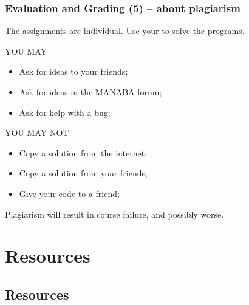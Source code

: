\documentclass{beamer}
\begin{document}
\begin{frame}
  \frametitle{Evaluation and Grading (5) -- about plagiarism}
  
  The assignments are \alert{individual}. Use your  to solve the programs.

  \begin{exampleblock}{YOU MAY}
    \begin{itemize}
    \item Ask for ideas to your friends;
    \item Ask for ideas in the MANABA forum;
    \item Ask for help with a bug;
    \end{itemize}
  \end{exampleblock}

  \begin{alertblock}{YOU MAY NOT}
    \begin{itemize}
    \item Copy a solution from the internet;
    \item Copy a solution from your friends;
    \item Give your code to a friend;
    \end{itemize}
  \end{alertblock}

  Plagiarism will result in course failure, and possibly worse.
\end{frame}

\section{Resources}
\subsection{Resources}
\end{document}
